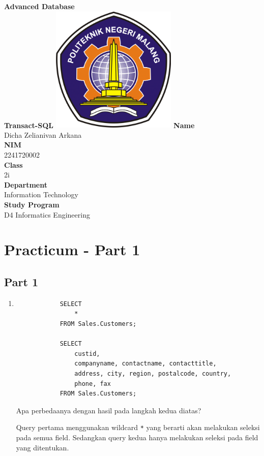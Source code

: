\documentclass[12pt,titlepage]{article}
\newcommand{\vSubject}{Advanced Database}
\newcommand{\vSubtitle}{Transact-SQL}
\newcommand{\vName}{Dicha Zelianivan Arkana}
\newcommand{\vNIM}{2241720002}
\newcommand{\vClass}{2i}
\newcommand{\vDepartment}{Information Technology}
\newcommand{\vStudyProgram}{D4 Informatics Engineering}
\begin{document}
\begin{titlepage}
    \centering
    \vfill
    {\bfseries\LARGE
        \vSubject\\
        \vskip0.25cm
        \vSubtitle
    }
    \vfill
    \includegraphics[width=6cm]{images/polinema-logo.png}
    \vfill
    {
        \textbf{Name}\\
        \vName\\
        \vskip0.5cm
        \textbf{NIM}\\
        \vNIM\\
        \vskip0.5cm
        \textbf{Class}\\
        \vClass\\
        \vskip0.5cm
        \textbf{Department}\\
        \vDepartment\\
        \vskip0.5cm
        \textbf{Study Program}\\
        \vStudyProgram
    }
\end{titlepage}

\section{Practicum - Part 1}
\subsection{Part 1}
\begin{enumerate}
    \item {
        \begin{verbatim}
            SELECT
                *
            FROM Sales.Customers;
            
            SELECT
                custid,
                companyname, contactname, contacttitle,
                address, city, region, postalcode, country,
                phone, fax
            FROM Sales.Customers;
        \end{verbatim}
        Apa perbedaanya dengan hasil pada langkah kedua diatas?

        Query pertama menggunakan wildcard \texttt{*} yang berarti akan melakukan seleksi pada semua field.
        Sedangkan query kedua hanya melakukan seleksi pada field yang ditentukan.
    }
\end{enumerate}
\end{document}
